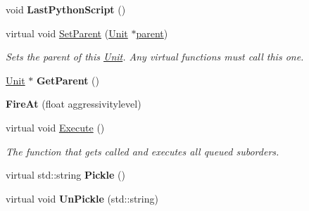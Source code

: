 \begin{DoxyCompactItemize}
\item 
void {\bfseries Last\+Python\+Script} ()\hypertarget{classOrders_1_1FireAt_aa3067c8a54c8d9547b6493009047bfdb}{}\label{classOrders_1_1FireAt_aa3067c8a54c8d9547b6493009047bfdb}

\item 
virtual void \hyperlink{classOrders_1_1FireAt_a5baee844238331c1b52c05b45f567e73}{Set\+Parent} (\hyperlink{classUnit}{Unit} $\ast$\hyperlink{classOrder_a57548b2476945f89ac22fafa4cb5863b}{parent})\hypertarget{classOrders_1_1FireAt_a5baee844238331c1b52c05b45f567e73}{}\label{classOrders_1_1FireAt_a5baee844238331c1b52c05b45f567e73}

\begin{DoxyCompactList}\small\item\em Sets the parent of this \hyperlink{classUnit}{Unit}. Any virtual functions must call this one. \end{DoxyCompactList}\item 
\hyperlink{classUnit}{Unit} $\ast$ {\bfseries Get\+Parent} ()\hypertarget{classOrders_1_1FireAt_ad04a07697ac3eb0169ddbcbb123974d8}{}\label{classOrders_1_1FireAt_ad04a07697ac3eb0169ddbcbb123974d8}

\item 
{\bfseries Fire\+At} (float aggressivitylevel)\hypertarget{classOrders_1_1FireAt_af8895fec4dad0e091285fe191e548dba}{}\label{classOrders_1_1FireAt_af8895fec4dad0e091285fe191e548dba}

\item 
virtual void \hyperlink{classOrders_1_1FireAt_a096a03fe925bc1fd639e05c5543d2734}{Execute} ()\hypertarget{classOrders_1_1FireAt_a096a03fe925bc1fd639e05c5543d2734}{}\label{classOrders_1_1FireAt_a096a03fe925bc1fd639e05c5543d2734}

\begin{DoxyCompactList}\small\item\em The function that gets called and executes all queued suborders. \end{DoxyCompactList}\item 
virtual std\+::string {\bfseries Pickle} ()\hypertarget{classOrders_1_1FireAt_a898249a6a5c66d2ff18b3ca8f466470b}{}\label{classOrders_1_1FireAt_a898249a6a5c66d2ff18b3ca8f466470b}

\item 
virtual void {\bfseries Un\+Pickle} (std\+::string)\hypertarget{classOrders_1_1FireAt_a08c5d66b35a27ec564db919c0d108b9a}{}\label{classOrders_1_1FireAt_a08c5d66b35a27ec564db919c0d108b9a}

\end{DoxyCompactItemize}

